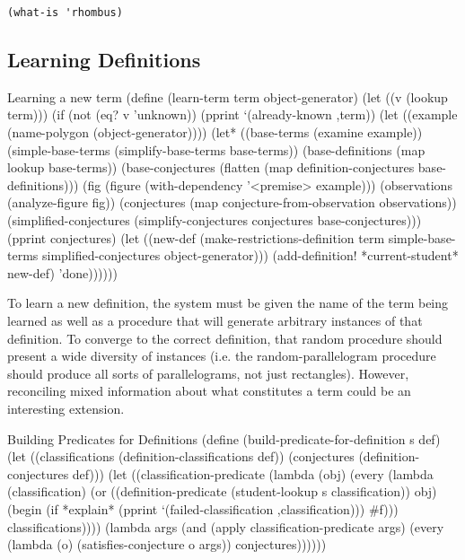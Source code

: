 \begin{verbatim}
(what-is 'rhombus)
\end{verbatim}

\subsection{Learning Definitions}

\begin{code-listing}{Learning a new term}
(define (learn-term term object-generator)
  (let ((v (lookup term)))
    (if (not (eq? v 'unknown))
        (pprint `(already-known ,term))
        (let ((example (name-polygon (object-generator))))
          (let* ((base-terms (examine example))
                 (simple-base-terms (simplify-base-terms base-terms))
                 (base-definitions (map lookup base-terms))
                 (base-conjectures (flatten (map definition-conjectures
                                                 base-definitions)))
                 (fig (figure (with-dependency '<premise> example)))
                 (observations (analyze-figure fig))
                 (conjectures (map conjecture-from-observation observations))
                 (simplified-conjectures
                  (simplify-conjectures conjectures base-conjectures)))
            (pprint conjectures)
            (let ((new-def
                   (make-restrictions-definition
                    term
                    simple-base-terms
                    simplified-conjectures
                    object-generator)))
              (add-definition! *current-student* new-def)
              'done))))))
\end{code-listing}

To learn a new definition, the system must be given the name of the
term being learned as well as a procedure that will generate arbitrary
instances of that definition. To converge to the correct definition,
that random procedure should present a wide diversity of instances
(i.e. the random-parallelogram procedure should produce all sorts of
parallelograms, not just rectangles). However, reconciling mixed
information about what constitutes a term could be an interesting
extension.

\begin{code-listing}{Building Predicates for Definitions}
(define (build-predicate-for-definition s def)
  (let ((classifications (definition-classifications def))
        (conjectures (definition-conjectures def)))
    (let ((classification-predicate
           (lambda (obj)
             (every
              (lambda (classification)
                (or ((definition-predicate (student-lookup s classification))
                     obj)
                    (begin (if *explain*
                               (pprint `(failed-classification
                                         ,classification)))
                           #f)))
              classifications))))
      (lambda args
        (and (apply classification-predicate args)
             (every (lambda (o) (satisfies-conjecture o args))
                    conjectures))))))
\end{code-listing}

